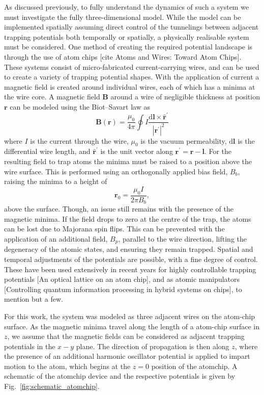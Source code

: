 As discussed previously, to fully understand the dynamics of such a system we must investigate the fully three-dimensional model. While the model can be implemented spatially assuming direct control of the tunnelings between adjacent trapping potentials both temporally or spatially, a physically realisable system must be considered. One method of creating the required potential landscape is through the use of atom chips \cite{Bartenstein_ieee_2000}[cite Atoms and Wires: Toward Atom Chips]. These systems consist of micro-fabricated current-carrying wires, and can be used to create a variety of trapping potential shapes. With the application of current a magnetic field is created around individual wires, each of which has a minima at the wire core. A magnetic field $\mathbf{B}$ around a wire of negligible thickness at position $\mathbf{r}$ can be modeled using the Biot--Savart law as
\begin{equation}
    \mathbf{B}(\mathbf{r}) = \frac{\mu_0}{4\pi}\oint I \frac{\text{d}\mathbf{l}\times \hat{\mathbf{r}}^{'}}{|\mathbf{r^{'}}|^2}
\end{equation}
where $I$ is the current through the wire, $\mu_0$ is the vacuum permeability, $\text{d}\mathbf{l}$ is the differential wire length, and $\hat{\mathbf{r}}^{'}$ is the unit vector along $\mathbf{r^{'}} = \mathbf{r} - \mathbf{l}$. For the resulting field to trap atoms the minima must be raised to a position above the wire surface. This is performed using an orthogonally applied bias field, ${B}_b$, raising the minima to a height of
\begin{equation}
    \mathbf{r}_0 = \frac{\mu_0 I}{2\pi {B}_b},
\end{equation}
above the surface. Though, an issue still remains with the presence of the magnetic minima. If the field drops to zero at the centre of the trap, the atoms can be lost due to Majorana spin flips. This can be prevented with the application of an additional field, ${B}_{p}$, parallel to the wire direction, lifting the degeneracy of the atomic states, and ensuring they remain trapped. Spatial and temporal adjustments of the potentials are possible, with a fine degree of control. These have been used extensively in recent years for highly controllable trapping potentials [An optical lattice on an atom chip], and as atomic manipulators [Controlling quantum information processing in hybrid systems on chips], to mention but a few.

For this work, the system was modeled as three adjacent wires on the atom-chip surface. As the magnetic minima travel along the length of a atom-chip surface in $z$, we assume that the magnetic fields can be considered as adjacent trapping potentials in the $x-y$ plane. The direction of propagation is then along $z$, where the presence of an additional harmonic oscillator potential is applied to impart motion to the atom, which begins at the $z=0$ position of the atomchip. A schematic of the atomchip device and the respective potentials is given by Fig.~\ref{fig:schematic_atomchip}.

